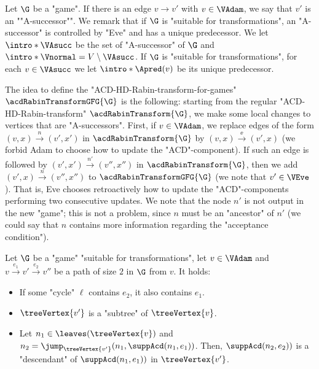 \documentclass[10pt,a4paper]{amsart}
\newcommand{\re}[1]{\xrightarrow{#1}}
\begin{document}
\AP Let $\G$ be a "game". If there is an edge $v\re{}v'$ with $v\in\VAdam$, we say that $v'$ is an ""A-successor"". We remark that if $\G$ is "suitable for transformations", an "A-successor" is controlled by "Eve" and has a unique predecessor. 
We let $\intro*\VAsucc$ be the set of "A-successor" of $\G$ and $\intro*\Vnormal = V\setminus \VAsucc$. If $\G$ is "suitable for transformations", for each $v\in \VAsucc$ we let $\intro*\Apred(v)$ be its unique predecessor.


The idea to define the "ACD-HD-Rabin-transform-for-games" $\acdRabinTransformGFG{\G}$ is the following: starting from the regular "ACD-HD-Rabin-transform" $\acdRabinTransform{\G}$, we make some local changes to vertices that are "A-successors". First, if $v\in \VAdam$, we replace edges of the form $(v,x)\re{n} (v',x')$ in $\acdRabinTransform{\G}$ by $(v,x)\re{\ee} (v',x)$ (we forbid Adam to choose how to update the "ACD"-component). If such an edge is followed by $(v',x')\re{n'} (v'',x'')$ in $\acdRabinTransform{\G}$, then we add $(v',x)\re{n} (v'',x'')$ to $\acdRabinTransformGFG{\G}$ (we note that $v'\in \VEve$). That is, Eve chooses retroactively how to update the "ACD"-components performing two consecutive updates. We note that the node $n'$ is not output in the new "game"; this is not a problem, since $n$ must be an "ancestor" of $n'$ (we could say that $n$ contains more information regarding the "acceptance condition").

\begin{remark}\label{rmk-app:bounded-edges}
	Let $\G$ be a "game" "suitable for transformations", let $v\in \VAdam$ and $v\re{e_1}v'\re{e_2}v''$ be a path of size $2$ in $\G$ from $v$. It holds:
	\begin{itemize}
		\item If some "cycle" $\ell$ contains $e_2$, it also contains $e_1$.
		\item $\treeVertex{v'}$ is a "subtree" of $\treeVertex{v}$.
		\item Let $n_1\in \leaves(\treeVertex{v})$ and $n_2 = \jump_{\treeVertex{v'}}(n_1, \suppAcd(n_1,e_1))$. Then, $\suppAcd(n_2,e_2))$ is a "descendant" of $\suppAcd(n_1,e_1))$ in $\treeVertex{v'}$.
	\end{itemize}  
\end{remark}
 
\end{document}

